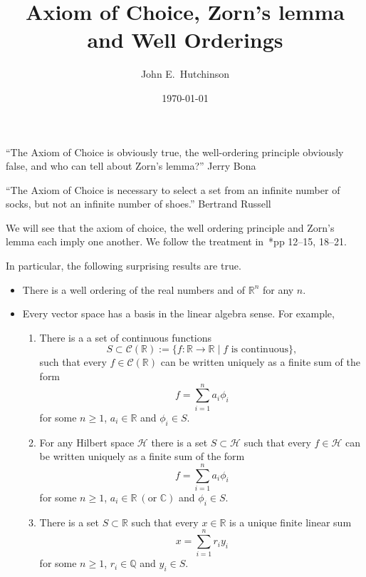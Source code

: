 \documentclass[a4paper]{amsart}
\theoremstyle{plain}
\theoremstyle{definition}
\theoremstyle{remark}
\begin{document}
\title{Axiom of Choice, Zorn's lemma and Well Orderings}  
\author{John E.\ Hutchinson}
\date{\today}




\maketitle
``The Axiom of Choice is obviously true, the well-ordering principle obviously false, and who can tell about Zorn's lemma?''   Jerry Bona

``The Axiom of Choice is necessary to select a set from an infinite number of socks, but not an infinite number of shoes.''   Bertrand Russell


\tableofcontents



We will see that the axiom of choice,  the well ordering principle and  Zorn's lemma each imply one another.  We follow  the treatment in~\cite{Dud}*{pp 12--15, 18--21}. 

In particular, the following surprising results are true.
\begin{itemize} 
\item There is a well ordering of the real numbers and of $ \mathbb{R}^n  $ for any $ n $.  
\item Every vector space has a basis in the linear algebra sense.  For example, 
\begin{enumerate}
 

\item There is a  a set of continuous functions 
\[ 
S \subset \mathcal{C} (\mathbb{R} ) := \{ f : \mathbb{R} \to \mathbb{R} \mid f \text{ is continuous}\},
\]
such that every $ f \in \mathcal{C} (\mathbb{R} )$ can be written uniquely as a finite sum of the form
\[
   f = \sum_{i=1}^n a_i \phi_i 
   \]
   for some $ n \geq 1 $, $ a_i \in \mathbb{R} $ and $ \phi_i \in S $.
   
   \item For any Hilbert space $ \mathcal{H} $ there is a set $ S \subset \mathcal{H} $ such that every $ f \in \mathcal{H} $ can be written uniquely as a finite sum of the form
\[
   f = \sum_{i=1}^n a_i \phi_i 
   \]
   for some $ n \geq 1 $, $ a_i \in \mathbb{R}\ (\text{or }\mathbb{C} ) $ and $ \phi_i \in S $.
   
   
\item There is a set $ S \subset \mathbb{R} $  such that every $ x \in \mathbb{R}$ is a unique finite linear sum 
\[
x = \sum_{i=1}^n r_i y_i 
\]
   for some $ n \geq 1 $, $ r_i \in \mathbb{Q}   $ and $ y_i \in S $.
\end{enumerate} 
\end{itemize} 
 
\end{document}
